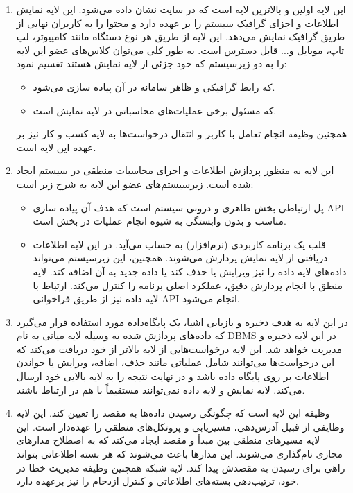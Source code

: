 \documentclass[12pt]{article}
\begin{document}
	\begin{enumerate}
	\item {}
	این لایه اولین و بالاترین لایه است که در سایت نشان داده می‌شود. این لایه نمایش اطلاعات و اجزای گرافیک سیستم را بر عهده دارد و محتوا را به کاربران نهایی از طریق گرافیک نمایش می‌دهد. این لایه از طریق هر نوع دستگاه مانند کامپیوتر، لپ تاپ، موبایل و... قابل دسترس است. به طور کلی می‌توان کلاس‌های عضو این لایه را به دو زیرسیستم که خود جزئی از لایه نمایش هستند تقسیم نمود:

	\begin{itemize}
		\item {}
	که رابط گرافیکی و ظاهر سامانه در آن پیاده سازی می‌شود.
		\item {}
		که مسئول برخی عملیات‌های محاسباتی در لایه نمایش است.
	\end{itemize}
	همچنین وظیفه انجام تعامل با کاربر و انتقال درخواست‌ها به لایه کسب و کار نیز بر عهده این لایه است.

	\item {}
	این لایه به منظور پردازش اطلاعات و اجرای محاسبات منطقی در سیستم ایجاد شده است. زیرسیستم‌های عضو این لایه به شرح زیر است:

	\begin{itemize}
		\item {}
	پل ارتباطی بخش ظاهری و درونی سیستم است که هدف آن پیاده سازی API مناسب و بدون وابستگی به شیوه انجام عملیات در بخش
	  است.

		\item {}
		 قلب یک برنامه کاربردی (نرم‌افزار) به حساب می‌آید. در این لایه اطلاعات دریافتی از لایه نمایش پردازش می‌شوند. همچنین، این زیرسیستم می‌تواند داده‌های لایه داده را نیز ویرایش یا حذف کند یا داده جدید به آن اضافه کند. لایه منطق با انجام پردازش دقیق، عملکرد اصلی برنامه را کنترل می‌کند. ارتباط با لایه داده نیز از طریق فراخوانی API انجام می‌شود.
	\end{itemize}

	\item {}
	در این لایه به هدف ذخیره و بازیابی اشیا، یک پایگاه‌داده مورد استفاده قرار می‌گیرد که داده‌های پردازش شده به وسيله لایه میانی به نام DBMS در این لایه ذخیره و مدیریت خواهد شد. این لایه درخواست‌هایی از لایه بالاتر از خود دریافت می‌کند که این درخواست‌ها می‌توانند شامل عملیاتی مانند حذف، اضافه، ویرایش یا خواندن اطلاعات بر روی پایگاه داده باشد و در نهایت نتیجه را به لایه بالایی خود ارسال می‌کند. لایه نمایش و لایه داده نمی‌توانند مستقیماً با هم در ارتباط باشند.

	\item {}
	وظیفه این لایه است که چگونگی رسیدن داده‌ها به مقصد را تعیین کند. این لایه وظایفی از قبیل آدرس‌دهی، مسیریابی و پروتکل‌های منطقی را عهده‌دار است. این لایه مسیرهای منطقی بین مبدأ و مقصد ایجاد می‌کند که به اصطلاح مدارهای مجازی نام‌گذاری می‌شوند. این مدارها باعث می‌شوند که هر بسته اطلاعاتی بتواند راهی برای رسیدن به مقصدش پیدا کند. لایه شبکه همچنین وظیفه مدیریت خطا در خود، ترتیب‌دهی بسته‌های اطلاعاتی و کنترل ازدحام را نیز برعهده دارد.

	\end{enumerate}
\end{document}
